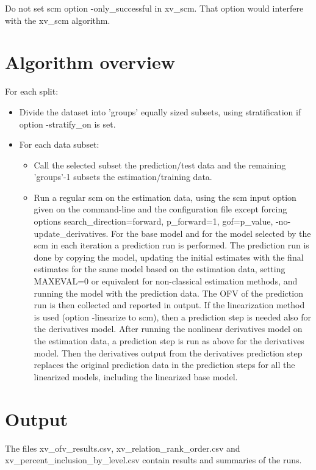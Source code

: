 Do not set scm option -only\_successful in xv\_scm. That option would interfere with the xv\_scm algorithm.


\section{Algorithm overview}

For each split: 
\begin{itemize}
\item[] Divide the dataset into 'groups' equally sized subsets, using stratification if option -stratify\_on is set.
\item[] For each data subset: 
\begin{itemize}
\item[] Call the selected subset the prediction/test data and the remaining 'groups'-1 subsets the estimation/training data. 
\item[] Run a regular scm on the estimation data, using the scm input option given on the command-line and the configuration file except forcing options search\_direction=forward, p\_forward=1,  gof=p\_value, -no-update\_derivatives. For the base model and for the model selected by the scm in each iteration a  prediction run is performed. The prediction run is  done by copying the model, updating the initial estimates with the final estimates for the same model based on the estimation data, setting MAXEVAL=0 or equivalent for non-classical estimation methods, and running the model with the prediction data. The OFV of the prediction run is then collected and reported in output.
If the linearization method is used (option -linearize to scm), then a prediction step is needed also for the derivatives model. After running the nonlinear derivatives model on the estimation data, a prediction step is run as above for the derivatives model. Then the derivatives output from the derivatives prediction step replaces the original prediction data in the prediction steps for all the linearized models, including the linearized base model.
\end{itemize}
\end{itemize}
\section{Output}
The files xv\_ofv\_results.csv,  xv\_relation\_rank\_order.csv and xv\_percent\_inclusion\_by\_level.csv contain results and summaries of the runs.



